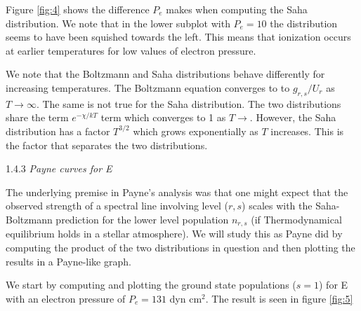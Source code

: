 \documentclass[a4paper,11.5pt,]{article}
\begin{document}
\begin{multicols}{2}
Figure \ref{fig:4} shows the difference $P_e$ makes when computing the Saha distribution. We note that in the lower subplot with $P_e = 10$ the distribution seems to have been squished towards the left. This means that ionization occurs at earlier temperatures for low values of electron pressure.

We note that the Boltzmann and Saha distributions behave differently for increasing temperatures. The Boltzmann equation converges to to $g_{r,s}/U_r$ as $T \rightarrow \infty$. The same is not true for the Saha distribution. The two distributions share the term $e^{-\chi /kT}$ term which converges to 1 as $T \rightarrow $. However, the Saha distribution has a factor $T^{3/2}$ which grows exponentially as $T$ increases. This is the factor that separates the two distributions.

\begin{center}
1.4.3\textit{ Payne curves for E}
\end{center}
The underlying premise in Payne's analysis was that one might expect that the observed strength of a spectral line involving level ($r,s$) scales with the Saha-Boltzmann prediction for the lower level population $n_{r,s}$ (if Thermodynamical equilibrium holds in a stellar atmosphere). We will study this as Payne did by computing the product of the two distributions in question and then plotting the results in a Payne-like graph. 

We start by computing and plotting the ground state populations ($s=1$) for E with an electron pressure of $P_e = 131$ dyn cm$^2$. The result is seen in figure \ref{fig:5}


\end{multicols}
\end{document}
